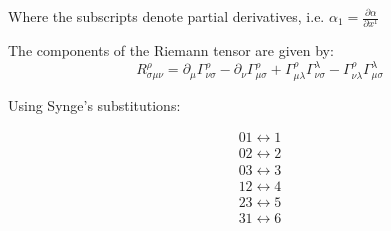 \documentclass{article}
\begin{document}
Where the subscripts denote partial derivatives, i.e. $\alpha_{1}=\frac{\partial\alpha}{\partial x^{1}}$

The components of the Riemann tensor are given by:
\begin{equation}
R_{\sigma\mu\nu}^{\rho}=\partial_{\mu}\Gamma_{\nu\sigma}^{\rho}-\partial_{\nu}\Gamma_{\mu\sigma}^{\rho}+\Gamma_{\mu\lambda}^{\rho}\Gamma_{\nu\sigma}^{\lambda}-\Gamma_{\nu\lambda}^{\rho}\Gamma_{\mu\sigma}^{\lambda}
\end{equation}

Using Synge's substitutions:
\begin{center}
\begin{equation}
\begin{array}{c}
01\longleftrightarrow1\\
02\longleftrightarrow2\\
03\longleftrightarrow3\\
12\longleftrightarrow4\\
23\longleftrightarrow5\\
31\longleftrightarrow6\\
\end{array}
\end{equation}
\end{center}
\end{document}
